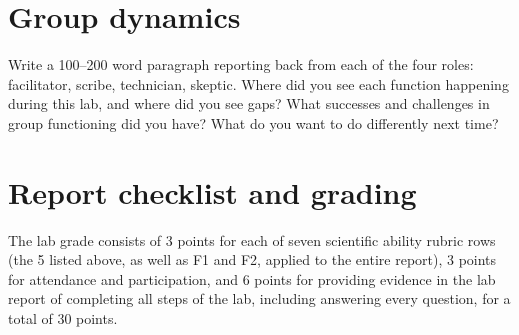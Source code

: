 \section{Group dynamics}

\begin{steps}
	\item Write a 100--200 word paragraph reporting back from each of the four roles: facilitator, scribe, technician, skeptic. Where did you see each function happening during this lab, and where did you see gaps? What successes and challenges in group functioning did you have? What do you want to do differently next time?
\end{steps}

\section{Report checklist and grading}

The lab grade consists of 3 points for each of seven scientific ability rubric rows (the 5 listed above, as well as F1 and F2, applied to the entire report), 3 points for attendance and participation, and 6 points for providing evidence in the lab report of completing all steps of the lab, including answering every question, for a total of 30 points.